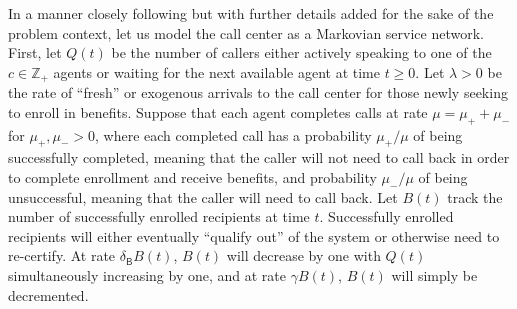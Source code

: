 \documentclass[manuscript,screen,authorversion]{acmart}
\begin{document}
In a manner closely following \citet{ding2015fluid} but with further details added for the sake of the problem context, let us model the call center as a Markovian service network.  First, let $Q(t)$ be the number of callers either actively speaking to one of the $c \in \mathbb{Z}_+$ agents or waiting for the next available agent at time $t \geq 0$. Let $\lambda > 0$ be the rate of ``fresh'' or exogenous arrivals to the call center for those newly seeking to enroll in benefits. Suppose that each agent completes calls at rate $\mu = \mu_{\mathsf{+}} + \mu_{\mathsf{-}}$ for $\mu_{\mathsf{+}}, \mu_{\mathsf{-}} > 0$, where each completed call has a probability $\mu_{\mathsf{+}}/\mu$ of being {successfully} completed, meaning that the caller will not need to call back in order to complete enrollment and receive benefits, and probability $\mu_{\mathsf{-}}/\mu$ of being unsuccessful, meaning that the caller will need to call back. Let $B(t)$ track the number of successfully enrolled recipients at time $t$. Successfully enrolled recipients will either eventually ``qualify out'' of the system or otherwise need to re-certify. 
At rate $\delta_\mathsf{B} B(t)$, $B(t)$ will decrease by one with $Q(t)$ simultaneously increasing by one, and at rate $\gamma B(t)$, $B(t)$ will simply be decremented. 
\end{document}
